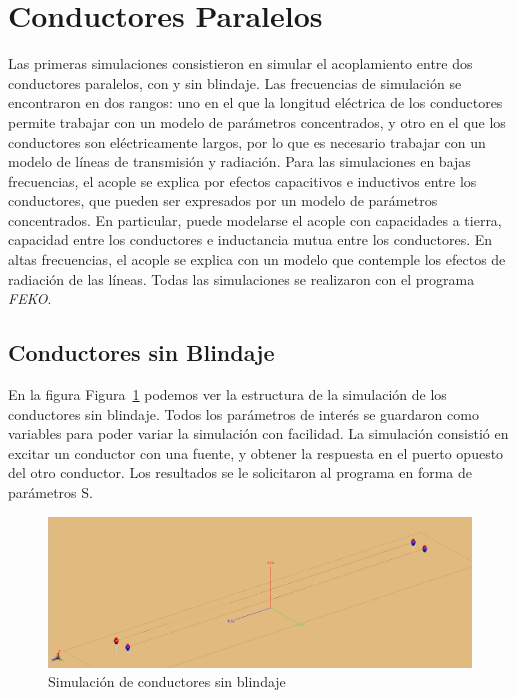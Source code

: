 \section{Conductores Paralelos}%
\label{sec:conductores_paralelos}
Las primeras simulaciones consistieron en simular el acoplamiento entre dos conductores paralelos, con y sin blindaje. Las frecuencias de simulación se encontraron en dos rangos: uno en el que la longitud eléctrica de los conductores permite trabajar con un modelo de parámetros concentrados, y otro en el que los conductores son eléctricamente largos, por lo que es necesario trabajar con un modelo de líneas de transmisión y radiación.
Para las simulaciones en bajas frecuencias, el acople se explica por efectos capacitivos e inductivos entre los conductores, que pueden ser expresados por un modelo de parámetros concentrados. En particular, puede modelarse el acople con capacidades a tierra, capacidad entre los conductores e inductancia mutua entre los conductores. En altas frecuencias, el acople se explica con un modelo que contemple los efectos de radiación de las líneas.
Todas las simulaciones se realizaron con el programa \textit{FEKO}.

\subsection{Conductores sin Blindaje}%
\label{sub:conductores_sin_blindaje}

En la figura Figura~\ref{fig:imagenes/conductores_sin_blindaje_simulacion} podemos ver la estructura de la simulación de los conductores sin blindaje. Todos los parámetros de interés se guardaron como variables para poder variar la simulación con facilidad. La simulación consistió en excitar un conductor con una fuente, y obtener la respuesta en el puerto opuesto del otro conductor. Los resultados se le solicitaron al programa en forma de parámetros S.

\begin{figure}[ht]
  \centering
  \includegraphics[width=0.8\linewidth]{imagenes/conductores_sin_blindaje_simulacion.png}
  \caption{Simulación de conductores sin blindaje}%
  \label{fig:imagenes/conductores_sin_blindaje_simulacion}
\end{figure}


